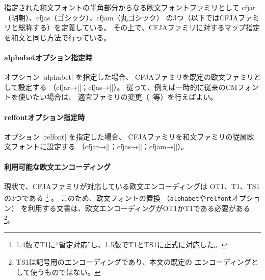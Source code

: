 \documentclass[uplatex,dvipdfmx,a4paper]{jsarticle}
\providecommand{\Strong}[1]{\textsf{#1}}
\begin{document}
指定された和文フォントの半角部分からなる欧文フォントファミリとして
cfjar（明朝）、cfjas（ゴシック）、cfjam（丸ゴシック）
の3つ（以下では\Strong{CFJAファミリ}と総称する）を定義している。
その上で、CFJAファミリに対するマップ指定を和文と同じ方法で行っている。

\paragraph{alphabetオプション指定時}
オプション |alphabet| を指定した場合、
CFJAファミリを既定の欧文ファミリとして設定する
（cfjar→|\rmdefault|；cfjas→|\sfdefault|）。
従って、例えば一時的に従来のCMフォントを使いたい場合は、
適宜ファミリの変更（||等）を行えばよい。

\paragraph{relfontオプション指定時}
オプション |relfont| を指定した場合、
CFJAファミリを和文ファミリの従属欧文フォントに設定する
（cfjar→|\mcfamily|；cfjas→|\gtfamily|；cfjam→|\mgfamily|）。

\paragraph{利用可能な欧文エンコーディング}
現状で、CFJAファミリが対応している欧文エンコーディングは
OT1、T1、TS1の3つである
\footnote{1.4版でT1に“暫定対応”し、1.5版でT1とTS1に正式に対応した。}%
。
このため、欧文フォントの置換
（\texttt{alphabet}や\texttt{relfont}オプション）
を利用する文書は、欧文エンコーディングがOT1かT1である必要がある
\footnote{TS1は記号用のエンコーディングであり、本文の既定の
エンコーディングとして使うものではない。}。
\end{document}
